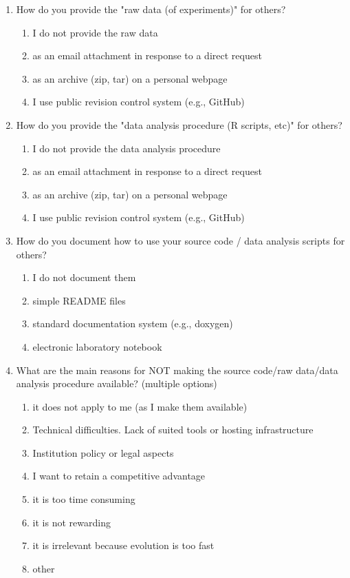 \documentclass{article}\usepackage[]{graphicx}\usepackage[]{color}
\begin{document}
\begin{enumerate}
\item How do you provide the "raw data (of experiments)" for others?
\begin{enumerate}
\item I do not provide the raw data
\item as an email attachment in response to a direct request
\item as an archive (zip, tar) on a personal webpage
\item I use public revision control system (e.g., GitHub)
\end{enumerate}

\item How do you provide the "data analysis procedure (R scripts, etc)" for others?
\begin{enumerate}
\item I do not provide the data analysis procedure
\item as an email attachment in response to a direct request
\item as an archive (zip, tar) on a personal webpage
\item I use public revision control system (e.g., GitHub)
\end{enumerate}

\item How do you document how to use your source code / data analysis
scripts for others?
\begin{enumerate}
\item I do not document them
\item simple README files
\item standard documentation system (e.g., doxygen)
\item electronic laboratory notebook
\end{enumerate}

\item What are the main reasons for NOT making the source code/raw
data/data analysis procedure available? (multiple options)
\begin{enumerate}
\item it does not apply to me (as I make them available)
\item Technical difficulties. Lack of suited tools or hosting
infrastructure
\item Institution policy or legal aspects
\item I want to retain a competitive advantage
\item it is too time consuming
\item it is not rewarding
\item it is irrelevant because evolution is too fast
\item other
\end{enumerate}


\end{enumerate}
\end{document}
